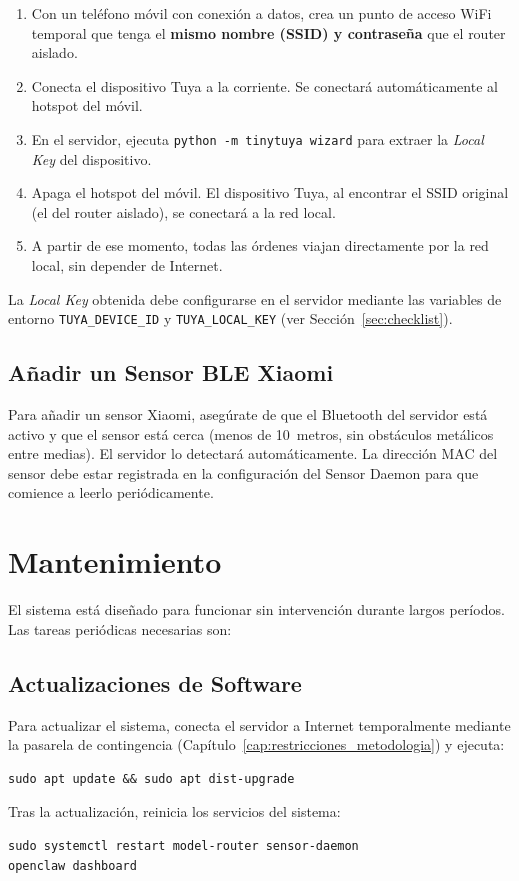 \begin{enumerate}
    \item Con un teléfono móvil con conexión a datos, crea un punto de acceso WiFi temporal que tenga el \textbf{mismo nombre (SSID) y contraseña} que el router aislado.
    \item Conecta el dispositivo Tuya a la corriente. Se conectará automáticamente al hotspot del móvil.
    \item En el servidor, ejecuta \texttt{python -m tinytuya wizard} para extraer la \textit{Local Key} del dispositivo.
    \item Apaga el hotspot del móvil. El dispositivo Tuya, al encontrar el SSID original (el del router aislado), se conectará a la red local.
    \item A partir de ese momento, todas las órdenes viajan directamente por la red local, sin depender de Internet.
\end{enumerate}

La \textit{Local Key} obtenida debe configurarse en el servidor mediante las variables de entorno \texttt{TUYA\_DEVICE\_ID} y \texttt{TUYA\_LOCAL\_KEY} (ver Sección~\ref{sec:checklist}).

\subsection{Añadir un Sensor BLE Xiaomi}

Para añadir un sensor Xiaomi, asegúrate de que el Bluetooth del servidor está activo y que el sensor está cerca (menos de 10~metros, sin obstáculos metálicos entre medias). El servidor lo detectará automáticamente. La dirección MAC del sensor debe estar registrada en la configuración del Sensor Daemon para que comience a leerlo periódicamente.

\section{Mantenimiento}

El sistema está diseñado para funcionar sin intervención durante largos períodos. Las tareas periódicas necesarias son:

\subsection{Actualizaciones de Software}
\label{sec:actualizaciones}
Para actualizar el sistema, conecta el servidor a Internet temporalmente mediante la pasarela de contingencia (Capítulo~\ref{cap:restricciones_metodologia}) y ejecuta:
\begin{verbatim}
sudo apt update && sudo apt dist-upgrade
\end{verbatim}
Tras la actualización, reinicia los servicios del sistema:
\begin{verbatim}
sudo systemctl restart model-router sensor-daemon
openclaw dashboard
\end{verbatim}

